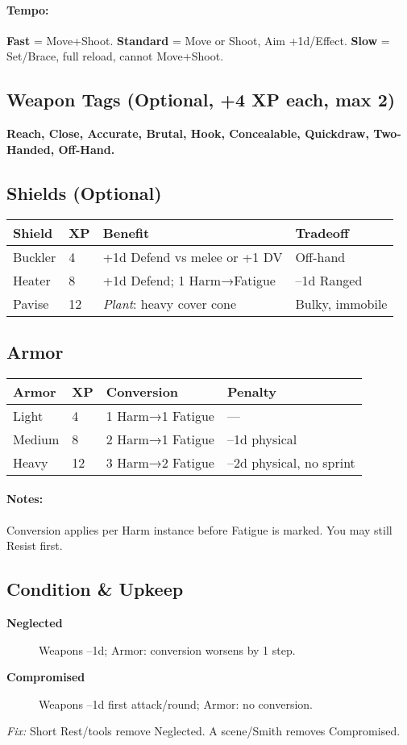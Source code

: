 \paragraph{Tempo:} \textbf{Fast} = Move+Shoot. \textbf{Standard} = Move or Shoot, Aim +1d/Effect. \textbf{Slow} = Set/Brace, full reload, cannot Move+Shoot.

\subsection{Weapon Tags (Optional, +4 XP each, max 2)}
\textbf{Reach, Close, Accurate, Brutal, Hook, Concealable, Quickdraw, Two-Handed, Off-Hand.}

\subsection{Shields (Optional)}
\begin{tabular}{llll}
\toprule
\textbf{Shield} & \textbf{XP} & \textbf{Benefit} & \textbf{Tradeoff} \\
\midrule
Buckler & 4 & +1d Defend vs melee or +1 DV & Off-hand \\
Heater  & 8 & +1d Defend; 1 Harm→Fatigue & –1d Ranged \\
Pavise  & 12 & \emph{Plant}: heavy cover cone & Bulky, immobile \\
\bottomrule
\end{tabular}

\subsection{Armor}
\begin{tabular}{llll}
\toprule
\textbf{Armor} & \textbf{XP} & \textbf{Conversion} & \textbf{Penalty} \\
\midrule
Light  & 4  & 1 Harm→1 Fatigue & — \\
Medium & 8  & 2 Harm→1 Fatigue & –1d physical \\
Heavy  & 12 & 3 Harm→2 Fatigue & –2d physical, no sprint \\
\bottomrule
\end{tabular}

\paragraph{Notes:} Conversion applies per Harm instance before Fatigue is marked. You may still Resist first.

\subsection{Condition \& Upkeep}
\begin{description}
  \item[\textbf{Neglected}] Weapons –1d; Armor: conversion worsens by 1 step.
  \item[\textbf{Compromised}] Weapons –1d first attack/round; Armor: no conversion.
\end{description}
\emph{Fix:} Short Rest/tools remove Neglected. A scene/Smith removes Compromised.

